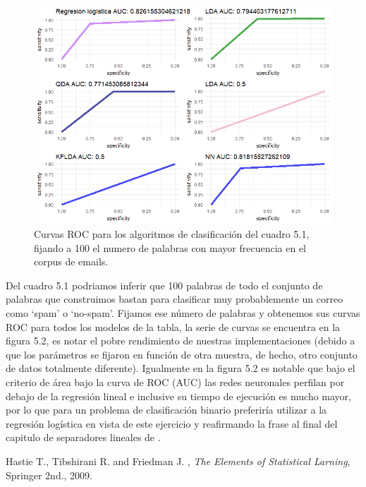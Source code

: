 \documentclass[paper=letter, fontsize=11pt]{scrartcl}
\numberwithin{equation}{section} %
\numberwithin{figure}{section} %
\numberwithin{table}{section} %
\begin{document}
\begin{enumerate}
\begin{figure}[H]
  \begin{center}
    \includegraphics[scale=.6]{rocs.png}
    \caption{Curvas ROC para los algoritmos de clasificación del cuadro 5.1, fijando a 100 el numero de palabras con mayor frecuencia en el corpus de emails.}
    \label{figura5_2}
  \end{center}
\end{figure}
\FloatBarrier
Del cuadro 5.1 podriamos inferir que 100 palabras de todo el conjunto de palabras que construimos bastan para clasificar muy probablemente un correo como ‘spam’ o ‘no-spam’. Fijamos ese número de palabras y obtenemos sus curvas ROC para todos los modelos de la tabla, la serie de curvas se encuentra en la figura 5.2, es notar el pobre rendimiento de nuestras implementaciones (debido a que los parámetros se fijaron en función de otra muestra, de hecho, otro conjunto de datos totalmente diferente). Igualmente en la figura 5.2 es notable que bajo el criterio de área bajo la curva de ROC (AUC) las redes neuronales perfilan por debajo de la regresión lineal e inclusive su tiempo de ejecución es mucho mayor, por lo que para un problema de clasificación binario preferiría utilizar a la regresión logística en vista de este ejercicio y reafirmando la frase al final del capitulo de separadores lineales de \cite{Has}. 
\end{enumerate}



\begin{thebibliography}{1}
Hastie T., Tibshirani R. and Friedman J. , \textit{The Elements of Statistical Larning}, Springer 2nd., 2009.

\end{thebibliography}
\end{document}
